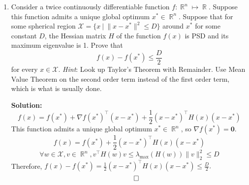 \documentclass{article}
\DeclareMathOperator{\R}{\mathbb{R}}
\newenvironment{solution}{\color{blue} \smallskip \textbf{Solution:}}{}
\begin{document}
\begin{enumerate}
    \begin{solution}
        \begin{enumerate}
            \item 
            $$
            f'(x) = \frac{1}{x + 1}
            $$
            $$ 
            f''(x) = -\frac{1}{(x + 1)^2}
            $$
            $$
            f'''(x) = \frac{2}{(x + 1)^3}
            $$
            $$
            f(x) \approx x - \frac{x^2}{2} + \frac{x^3}{3}
            $$
        \item 
            $$
            \Gamma(1) = 0! = 1
            $$
            $$
            \psi(1) = \frac{\Gamma'(1)}{\Gamma(1)} = -\gamma
            $$
            $$
            \Gamma'(1) = -\gamma
            $$
            $$
            \Gamma(1.1) = \Gamma(1) + \Gamma'(1) (1.1 - 1) = 1 - 0.1\gamma
            $$
        \end{enumerate}
        \[ \qedhere \]
    \end{solution}

    \item 
    Consider a twice continuously differentiable function $f: \R^{n} \mapsto \R$. 
    Suppose this function admits a unique global optimum $x^* \in \R^n$. 
    Suppose that for some spherical region $\mathcal{X} = \{x \ | \ \|x-x^*\|^2 \leq D\}$ around $x^*$ for some constant $D$, the Hessian matrix $H$ of the function $f(x)$ is PSD and its maximum eigenvalue is 1. 
    Prove that
    \[
        f(x) - f(x^*) \leq \frac{D}{2} 
    \]
    for every $x \in \mathcal{X}$.
    {\em Hint}: Look up Taylor's Theorem with Remainder. 
    Use Mean Value Theorem on the second order term instead of the first order term, which is what is usually done.

    \begin{solution}
        $$
        f(x) = f(x^*) + \nabla f(x^*)^\top(x - x^*)+\frac{1}{2}(x - x^*)^\top H(x) (x - x^*)
        $$
        This function admits a unique global optimum $x^* \in \R^n$, so $\nabla f(x^*) = \mathbf{0}$.
        $$
        f(x) = f(x^*) + \frac{1}{2}(x - x^*)^\top H(x) (x - x^*)
        $$
        $$
        \forall w \in \mathcal{X}, v \in \R^n, v^\top H(w) v \leq \lambda_{\max}(H(w))\|v\|^2_2 \leq D
        $$
        Therefore, $
        f(x) - f(x^*) = \frac{1}{2}(x - x^*)^\top H(x) (x - x^*) \leq \frac{D}{2}.
        $
        \[ \qedhere \]

    \end{solution}

\end{enumerate}
\end{document}
